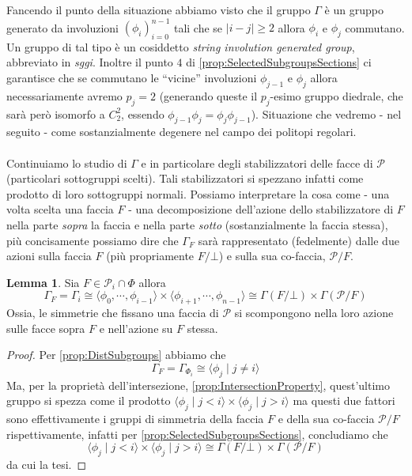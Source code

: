 \documentclass[a4paper,12pt]{report}
\newcommand{\p}{\mathcal{P}}
\theoremstyle{plain}
\theoremstyle{definition}
\newtheorem{lem}[teo]{Lemma}
\begin{document}
Fancendo il punto della situazione abbiamo visto che il gruppo $\Gamma$ \`e un gruppo generato da involuzioni $(\phi_i)_{i=0}^{n-1}$ tali che
se $|i-j|\geq 2$ allora $\phi_i$ e $\phi_j$ commutano. Un gruppo di tal tipo \`e un cosiddetto \emph{string involution generated group},
abbreviato in \emph{sggi}. Inoltre il punto $4$ di \ref{prop:SelectedSubgroupsSections} ci garantisce che se commutano le ``vicine''
involuzioni $\phi_{j-1}$ e $\phi_j$ allora necessariamente avremo $p_j=2$ (generando queste il $p_j$-esimo gruppo diedrale, che sar\`a per\`o isomorfo
a $C_2^2$, essendo $\phi_{j-1}\phi_j=\phi_j\phi_{j-1}$). Situazione che vedremo - nel seguito - come sostanzialmente degenere nel campo dei
politopi regolari.\\\\
Continuiamo lo studio di $\Gamma$ e in particolare degli stabilizzatori delle facce di $\p$ (particolari sottogruppi scelti).
Tali stabilizzatori si spezzano infatti come prodotto di loro sottogruppi normali.
Possiamo interpretare la cosa come - una volta scelta una faccia $F$ - una decomposizione dell'azione
dello stabilizzatore di $F$ nella parte \emph{sopra} la faccia e nella parte \emph{sotto} (sostanzialmente la faccia stessa), pi\`u concisamente
possiamo dire
che $\Gamma_F$ sar\`a rappresentato (fedelmente) dalle due azioni sulla faccia $F$ (pi\`u propriamente $F/\bot$) e sulla sua co-faccia, $\p/F$.
\begin{lem}
\label{lem:StabilizerFaceIsProduct}
Sia $F\in\p_i\cap\Phi$ allora
\begin{equation*}
\Gamma_F=\Gamma_{i}\cong\langle\phi_0,\cdots,\phi_{i-1}\rangle\times\langle\phi_{i+1},\cdots,\phi_{n-1}\rangle\cong\Gamma(F/\bot)\times\Gamma(\p/F)
\end{equation*}
Ossia, le simmetrie che fissano una faccia di $\p$ si scompongono nella loro azione sulle facce sopra $F$ e nell'azione su $F$ stessa.
\end{lem}
\begin{proof}
Per \ref{prop:DistSubgroups} abbiamo che 
\begin{equation*}
\Gamma_F=\Gamma_{\Phi_i}\cong\langle\phi_j\mid j\neq i\rangle
\end{equation*}
Ma, per la propriet\`a dell'intersezione, \ref{prop:IntersectionProperty}, quest'ultimo gruppo si spezza come il prodotto
$\langle\phi_j\mid j<i\rangle\times\langle\phi_j\mid j>i\rangle$ ma questi due fattori sono effettivamente i gruppi di simmetria
della faccia $F$ e della sua co-faccia $\p/F$ rispettivamente, infatti per \ref{prop:SelectedSubgroupsSections}, concludiamo che
\begin{equation*}
\langle\phi_j\mid j<i\rangle\times\langle\phi_j\mid j>i\rangle\cong\Gamma(F/\bot)\times\Gamma(\p/F)
\end{equation*}
da cui la tesi.
\end{proof}
\end{document}
